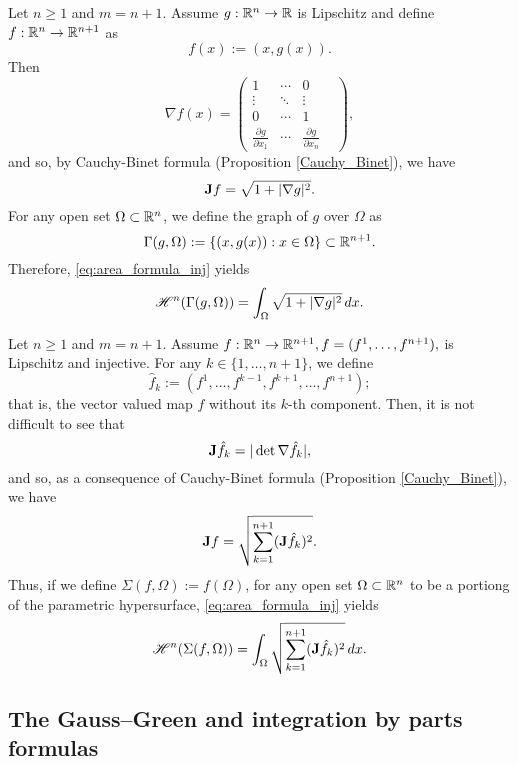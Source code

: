 \begin{example}
Let $n \ge 1$ and $m = n + 1$. Assume $g: \mathbb{R}^{n} \to \mathbb{R}$ is Lipschitz and define $f: \mathbb{R}^{n} \to \mathbb{R}^{n + 1}$ as $$f(x) := (x, g(x)).$$
Then
\[\nabla f(x) = \begin{pmatrix} 1 & \cdots & 0 & \\ \vdots & \ddots & \vdots \\ 
0 & \cdots & 1 & \\ \frac{\partial g}{\partial x_{1}} & \cdots & \frac{\partial g}{\partial x_{n}} & \end{pmatrix},\]
and so, by Cauchy-Binet formula (Proposition \ref{Cauchy_Binet}), we have
\begin{equation*}
{\bf J} f = \sqrt{1 + |\nabla g|^2}.
\end{equation*}
For any open set $\Omega \subset \mathbb{R}^{n}$, we define the graph of $g$ over $\Omega$ as
$$ \Gamma(g, \Omega) := \{ (x, g(x)) : x \in \Omega \} \subset \mathbb{R}^{n + 1}.$$
Therefore, \eqref{eq:area_formula_inj} yields
\begin{equation*}
\mathscr{H}^{n}(\Gamma(g, \Omega)) = \int_{\Omega} \sqrt{1 + |\nabla g|^{2}} \, dx.
\end{equation*}
\end{example}

\begin{example}
Let $n \ge 1$ and $m = n + 1$. Assume $f : \mathbb{R}^{n} \to \mathbb{R}^{n + 1}, f = (f^1, \dots, f^{n + 1}),$ is Lipschitz and injective. For any $k \in \{1, \dots, n + 1 \}$, we define $$\hat{f}_{k} := (f^{1}, \dots, f^{k - 1}, f^{k + 1}, \dots, f^{n + 1});$$
that is, the vector valued map $f$ without its $k$-th component. Then, it is not difficult to see that $${\bf J} \hat{f}_{k} = |\det{\nabla \hat{f}_{k}}|,$$
and so, as a consequence of Cauchy-Binet formula (Proposition \ref{Cauchy_Binet}), we have
\begin{equation*}
{\bf J} f = \sqrt{\sum_{k = 1}^{n + 1} ({\bf J} \hat{f}_{k})^{2}}.
\end{equation*}
Thus, if we define $\Sigma(f, \Omega) := f(\Omega)$, for any open set $\Omega \subset \mathbb{R}^{n}$ to be a portiong of the parametric hypersurface, \eqref{eq:area_formula_inj} yields
\begin{equation*}
\mathscr{H}^{n}(\Sigma(f, \Omega)) = \int_{\Omega} \sqrt{\sum_{k = 1}^{n + 1} ({\bf J} \hat{f}_{k})^{2}} \, dx.
\end{equation*}
\end{example}



\subsection{The Gauss--Green and integration by parts formulas}

